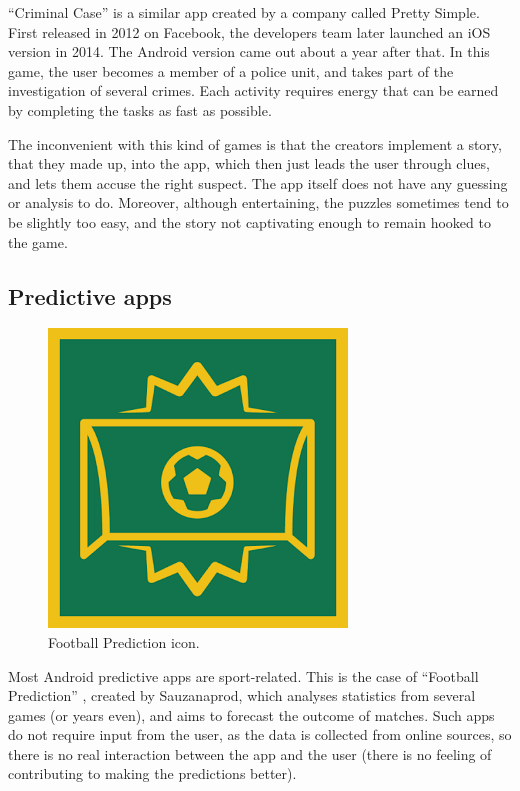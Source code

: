 \documentclass{mproj}
\begin{document}
``Criminal Case'' \cite{criminalcase} is a similar app created by a company called Pretty Simple. First released in 2012 on Facebook, the developers team later launched an iOS version in 2014. The Android version came out about a year after that. In this game, the user becomes a member of a police unit, and takes part of the investigation of several crimes. Each activity requires energy that can be earned by completing the tasks as fast as possible.\\ \par

The inconvenient with this kind of games is that the creators implement a story, that they made up, into the app, which then just leads the user through clues, and lets them accuse the right suspect. The app itself does not have any guessing or analysis to do.
Moreover, although entertaining, the puzzles sometimes tend to be slightly too easy, and the story not captivating enough to remain hooked to the game.

\subsection*{Predictive apps}

\begin{figure}
	\vspace{-10pt}
	\centering
	\includegraphics[scale=0.25]{images/football_prediction}
	\caption{Football Prediction icon.}
	\vspace{-25pt}
\end{figure}

Most Android predictive apps are sport-related. This is the case of  ``Football Prediction'' \cite{footballprediction}, created by Sauzanaprod, which analyses statistics from several games (or years even), and aims to forecast the outcome of matches. Such apps do not require input from the user, as the data is collected from online sources, so there is no real interaction between the app and the user (there is no feeling of contributing to making the predictions better).
\end{document}
